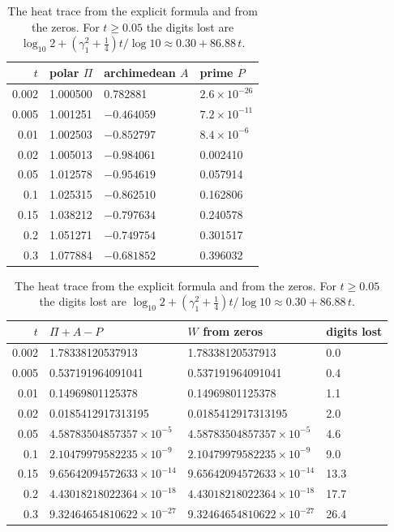 \begin{table}[htbp]
\centering\footnotesize
\begin{tabular}{@{}rlll@{}}
\toprule
$t$ & polar $\Pi$ & archimedean $A$ & prime $P$\\
\midrule
0.002 & 1.000500 & 0.782881 & $2.6\times10^{-26}$\\
0.005 & 1.001251 & $-0.464059$ & $7.2\times10^{-11}$\\
0.01 & 1.002503 & $-0.852797$ & $8.4\times10^{-6}$\\
0.02 & 1.005013 & $-0.984061$ & 0.002410\\
0.05 & 1.012578 & $-0.954619$ & 0.057914\\
0.1 & 1.025315 & $-0.862510$ & 0.162806\\
0.15 & 1.038212 & $-0.797634$ & 0.240578\\
0.2 & 1.051271 & $-0.749754$ & 0.301517\\
0.3 & 1.077884 & $-0.681852$ & 0.396032\\
\bottomrule
\end{tabular}

\medskip
\begin{tabular}{@{}rlll@{}}
\toprule
$t$ & $\Pi+A-P$ & $W$ from zeros & digits lost\\
\midrule
0.002 & 1.78338120537913 & 1.78338120537913 & 0.0\\
0.005 & 0.537191964091041 & 0.537191964091041 & 0.4\\
0.01 & 0.14969801125378 & 0.14969801125378 & 1.1\\
0.02 & 0.0185412917313195 & 0.0185412917313195 & 2.0\\
0.05 & $4.58783504857357\times10^{-5}$ & $4.58783504857357\times10^{-5}$ & 4.6\\
0.1 & $2.10479979582235\times10^{-9}$ & $2.10479979582235\times10^{-9}$ & 9.0\\
0.15 & $9.65642094572633\times10^{-14}$ & $9.65642094572633\times10^{-14}$ & 13.3\\
0.2 & $4.43018218022364\times10^{-18}$ & $4.43018218022364\times10^{-18}$ & 17.7\\
0.3 & $9.32464654810622\times10^{-27}$ & $9.32464654810622\times10^{-27}$ & 26.4\\
\bottomrule
\end{tabular}
\caption{The heat trace from the explicit formula and from the zeros. For $t\ge0.05$ the digits lost are $\log_{10}2+(\gamma_1^2+\frac14)t/\log10\approx0.30+86.88\,t$.}
\label{tab:ch14:W}
\end{table}

